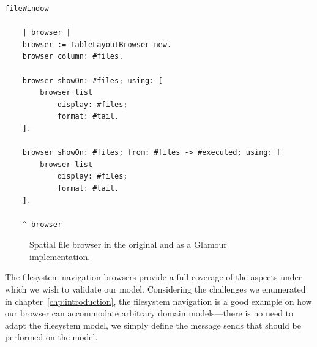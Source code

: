 \documentclass[a4paper,10pt,twoside]{book}
\begin{document}
\begin{lstlisting}
fileWindow

	| browser |
	browser := TableLayoutBrowser new.
	browser column: #files.

	browser showOn: #files; using: [
		browser list
			display: #files;
			format: #tail.
	].

	browser showOn: #files; from: #files -> #executed; using: [
		browser list
			display: #files;
			format: #tail.
	].

	^ browser
\end{lstlisting}

\begin{figure}[tbp]
\begin{center}
\caption{Spatial file browser in the original and as a Glamour implementation.}
\label{fig:casestudies/file_window}
\end{center}
\end{figure}

The filesystem navigation browsers provide a full coverage of the aspects under which we wish to validate our model. Considering the challenges we enumerated in chapter~\ref{chp:introduction}, the filesystem navigation is a good example on how our browser can accommodate arbitrary domain models---there is no need to adapt the filesystem model, we simply define the message sends that should be performed on the model.
\end{document}
